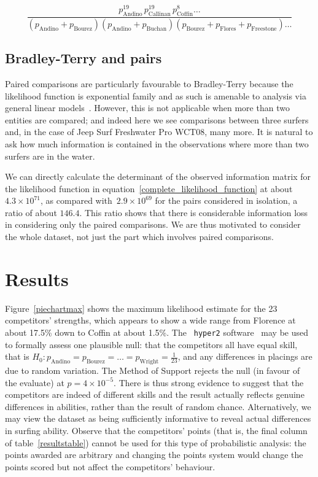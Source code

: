 \documentclass{article}
\begin{document}
\begin{equation}\label{complete_likelihood_function}
\frac{
p_\mathrm{Andino}^{19}\, p_\mathrm{Callinan}^{19}\, p_\mathrm{Coffin}^{8}\ldots
}{
(p_\mathrm{Andino} + p_\mathrm{Bourez})  (p_\mathrm{Andino} + p_\mathrm{Buchan})(p_\mathrm{Bourez} + p_\mathrm{Flores} + p_\mathrm{Freestone})\ldots
}
\end{equation}


\subsection{Bradley-Terry and pairs}

Paired comparisons are particularly favourable to Bradley-Terry
because the likelihood function is exponential family and as such is
amenable to analysis via general linear models~\citep{turner2012}.
However, this is not applicable when more than two entities are
compared; and indeed here we see comparisons between three surfers
and, in the case of Jeep Surf Freshwater Pro WCT08, many more.  It
is natural to ask how much information is contained in the
observations where more than two surfers are in the water.

We can directly calculate the determinant of the observed information
matrix for the likelihood function in
equation~\ref{complete_likelihood_function} at about $4.3\times
10^{71}$, as compared with~$2.9\times 10^{69}$ for the pairs
considered in isolation, a ratio of about $146.4$.  This ratio shows
that there is considerable information loss in considering only the
paired comparisons.  We are thus motivated to consider the whole
dataset, not just the part which involves paired comparisons.

\section{Results}

Figure~\ref{piechartmax} shows the maximum likelihood estimate for the
23 competitors' strengths, which appears to show a wide range from
Florence at about 17.5\% down to Coffin at about 1.5\%.  The {\tt
  hyper2} software~\citep{hankin2017} may be used to formally assess
one plausible null: that the competitors all have equal skill, that is
$H_0\colon p_\mathrm{Andino} = p_\mathrm{Bourez}=\ldots=
p_\mathrm{Wright}=\frac{1}{23}$, and any differences in placings are
due to random variation.  The Method of Support \citep{edwards1992}
rejects the null (in favour of the evaluate) at $p=4\times 10^{-5}$.
There is thus strong evidence to suggest that the competitors are
indeed of different skills and the result actually reflects genuine
differences in abilities, rather than the result of random chance.
Alternatively, we may view the dataset as being sufficiently
informative to reveal actual differences in surfing ability.  Observe
that the competitors' points (that is, the final column of
table~\ref{resultstable}) cannot be used for this type of
probabilistic analysis: the points awarded are arbitrary and changing
the points system would change the points scored but not affect the
competitors' behaviour.
\end{document}

